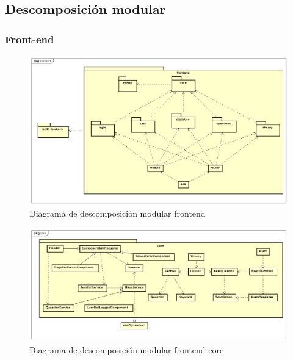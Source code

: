 \documentclass[openright,twoside,10pt]{book}
\begin{document}
    \vspace*{\fill} \newpage
    
    \subsection{Descomposición modular}\label{descomposiciuxf3n-modular}
    
    \subsubsection{Front-end}\label{front-end}
    
    \vspace*{\fill}
    
    \begin{figure}[H]
        \begin{center}
            \includegraphics[width=\textwidth, angle=-90]{img/astah/disenio/descomposicion/front/descomposicion.png}
        \end{center}
        \caption{Diagrama de descomposición modular frontend}
    \end{figure}
    
    \vspace*{\fill} \newpage
    
    \vspace*{\fill}
    
    \begin{figure}[H]
        \begin{center}
            \includegraphics[width=\textwidth, angle=-90]{img/astah/disenio/descomposicion/front/core.png}
        \end{center}
        \caption{Diagrama de descomposición modular frontend-core}
    \end{figure}
    
\end{document}
